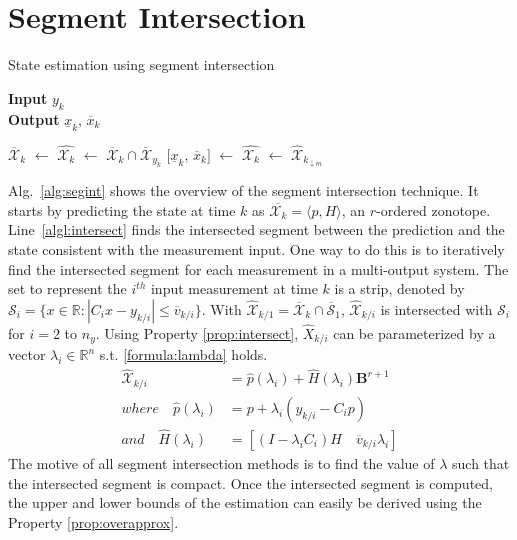 \section{Segment Intersection} 
\begin{algorithm}[H]
        \caption{State estimation using segment intersection}
        \textbf{Input} $y_k$\\
 		\textbf{Output} $\underline{x}_k$, $\overline{x}_k$
        \begin{algorithmic}[1]
        \State $\overline{\mathcal{X}}_k$ $\gets$ 
        \State $\hat{\mathcal{X}_{k}}$ $\gets$ $\overline{\mathcal{X}}_k \cap \overline{\mathcal{X}}_{y_k}$ \label{algl:intersect}
        \State $[\underline{x}_k$, $\overline{x}_k]$ $\gets$ 
        \State $\hat{\mathcal{X}_{k}}$ $\gets$ $\hat{\mathcal{X}}_{k_{\downarrow m}}$ \label{algl:reduce}
        \end{algorithmic}
        \label{alg:segint}
\end{algorithm}
Alg.~\ref{alg:segint} shows the overview of the segment intersection technique. It starts by predicting the state at time $k$ as $\overline{\mathcal{X}_k} = \langle p , H \rangle $, an $r$-ordered zonotope. Line~\ref{algl:intersect} finds the intersected segment between the prediction and the state consistent with the measurement input. One way to do this is to iteratively find the intersected segment for each measurement in a multi-output system. The set to represent the $i^{th}$ input measurement at time $k$  is a strip, denoted by $\mathscr{S}_i = \{x \in \mathbb{R} : |C_i x - y_{k/i}| \leq \overline{v}_{k/i}\}$. With $\hat{\mathcal{X}}_{k/1} = \overline{\mathcal{X}}_k \cap \overline{\mathscr{S}}_1$, $\hat{\mathcal{X}}_{k/i}$  is intersected with $\mathscr{S}_i$ for $i=2$ to $n_y$. Using Property \ref{prop:intersect}, $\hat{X}_{k/i}$ can be parameterized by a vector $\lambda_i \in \mathbb{R}^n$ s.t. \eqref{formula:lambda} holds.
\begin{equation}
\label{formula:lambda}
\begin{split}
\mathcal{\hat{X}}_{k/i} &= \hat{p}(\lambda_i) + \hat{H}(\lambda_i)\textbf{B}^{r+1}  \\
where \quad \hat{p}(\lambda_i) &= p+ \lambda_i(y_{k/i} - C_i p)\\
and \quad \hat{H}(\lambda_i) &= [(I- \lambda_i C_i) H \quad \overline{v}_{k/i} \lambda_i ]
\end{split}
\end{equation}
The motive of all segment intersection methods is to find the value of $\lambda$ such that the intersected segment is compact. Once the intersected segment is computed, the upper and lower bounds of the estimation can easily be derived using the Property \ref{prop:overapprox}.

